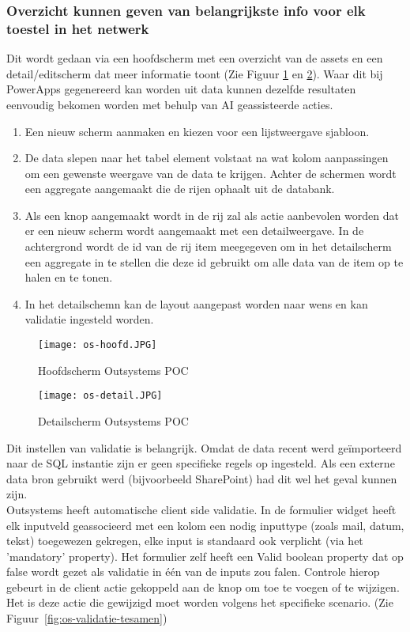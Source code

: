 \subsubsection{Overzicht kunnen geven van belangrijkste info voor elk toestel in het netwerk}

Dit wordt gedaan via een hoofdscherm met een overzicht van de assets en een detail/editscherm dat meer informatie toont (Zie Figuur \ref{fig:os-hoofd} en \ref{fig:os-detail}).
Waar dit bij PowerApps gegenereerd kan worden uit data kunnen dezelfde resultaten eenvoudig bekomen worden met behulp van AI geassisteerde acties.
\begin{enumerate}
    \item Een nieuw scherm aanmaken en kiezen voor een lijstweergave sjabloon.
    \item De data slepen naar het tabel element volstaat na wat kolom aanpassingen om een gewenste weergave van de data te krijgen. Achter de schermen wordt een aggregate aangemaakt die de rijen ophaalt uit de databank.
    \item Als een knop aangemaakt wordt in de rij zal als actie aanbevolen worden dat er een nieuw scherm wordt aangemaakt met een detailweergave. In de achtergrond wordt de id van de rij item meegegeven om in het detailscherm een aggregate in te stellen die deze id gebruikt om alle data van de item op te halen en te tonen.
    \item In het detailschemn kan de layout aangepast worden naar wens en kan validatie ingesteld worden.
\end{enumerate}

\begin{figure}[h!]
    \texttt{[image: os-hoofd.JPG]}
    \caption{Hoofdscherm Outsystems POC}
    \label{fig:os-hoofd}
\end{figure}

\begin{figure}[h!]
    \texttt{[image: os-detail.JPG]}
    \caption{Detailscherm Outsystems POC}
    \label{fig:os-detail}
\end{figure}

Dit instellen van validatie is belangrijk. Omdat de data recent werd geïmporteerd naar de SQL instantie zijn er geen specifieke regels op ingesteld. Als een externe data bron gebruikt werd (bijvoorbeeld SharePoint) had dit wel het geval kunnen zijn.\\
Outsystems heeft automatische client side validatie. \autocite{OutSystemsDocs} In de formulier widget heeft elk inputveld geassocieerd met een kolom een nodig inputtype (zoals mail, datum, tekst) toegewezen gekregen, elke input is standaard ook verplicht (via het 'mandatory' property). Het formulier zelf heeft een Valid boolean property dat op false wordt gezet als validatie in één van de inputs zou falen. Controle hierop gebeurt in de client actie gekoppeld aan de knop om toe te voegen of te wijzigen. Het is deze actie die gewijzigd moet worden volgens het specifieke scenario. (Zie Figuur~\ref{fig:os-validatie-tesamen})

